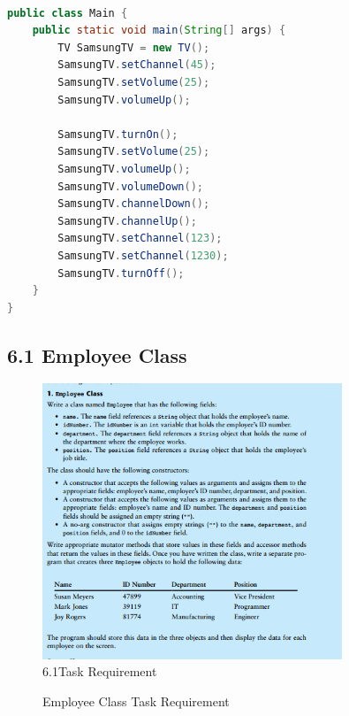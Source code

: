 \documentclass{article}
\begin{document}
\begin{lstlisting}[language=Java, caption=Main.java]

public class Main {
    public static void main(String[] args) {
        TV SamsungTV = new TV();
        SamsungTV.setChannel(45);
        SamsungTV.setVolume(25);
        SamsungTV.volumeUp();

        SamsungTV.turnOn();
        SamsungTV.setVolume(25);
        SamsungTV.volumeUp();
        SamsungTV.volumeDown();
        SamsungTV.channelDown();
        SamsungTV.channelUp();
        SamsungTV.setChannel(123);
        SamsungTV.setChannel(1230);
        SamsungTV.turnOff();
    }
}
\end{lstlisting}

\subsection*{6.1 Employee Class}
\begin{figure}[H]
    \centering
    \includegraphics[width=0.8\textwidth]{./Assets/Task requirements/Assignment6/6.1.png}
    
    \caption{6.1Task Requirement}
\end{figure}

\begin{figure}[h]
    \centering
    \caption{Employee Class Task Requirement}
\end{figure}
\end{document}
